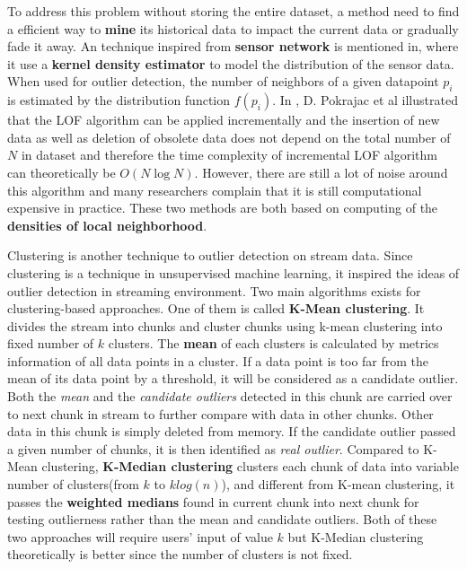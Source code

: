 \documentclass[11pt]{article}       %
\begin{document}
To address this problem without storing the entire dataset, a method need to find a efficient way to \textbf{mine} its historical data to impact the current data or gradually fade it away. An technique inspired from \textbf{sensor network} is mentioned in\cite{ubramaniam:2006:OOD:1182635.1164145}, where it use a \textbf{kernel density estimator} to model the distribution of the sensor data. When used for outlier detection, the number of neighbors of a given datapoint $p_{i}$ is estimated by the distribution function $f(p_{i})$. In \cite{4221341}, D. Pokrajac et al illustrated that the LOF algorithm can be applied incrementally and the insertion of new data as well as deletion of obsolete data does not depend on the total number of $N$ in dataset and therefore the time complexity of incremental LOF algorithm can theoretically be $O(N\log{N})$. However, there are still a lot of noise around this algorithm and many researchers complain that it is still computational expensive in practice. These two methods are both based on computing of the \textbf{densities of local neighborhood}.

Clustering is another technique to outlier detection on stream data. Since clustering is a technique in unsupervised machine learning, it inspired the ideas of outlier detection in streaming environment. Two main algorithms exists for clustering-based approaches. One of them is called \textbf{K-Mean clustering}\cite{4666541}. It divides the stream into chunks and cluster chunks using k-mean clustering into fixed number of $k$ clusters. The \textbf{mean} of each clusters is calculated by metrics information of all data points in a cluster. If a data point is too far from the mean of its data point by a threshold, it will be considered as a candidate outlier. Both the \textit{mean} and the \textit{candidate outliers} detected in this chunk are carried over to next chunk in stream to further compare with data in other chunks. Other data in this chunk is simply deleted from memory. If the candidate outlier passed a given number of chunks, it is then identified as \textit{real outlier}. Compared to K-Mean clustering, \textbf{K-Median clustering}\cite{DBLP:journals/corr/abs-1002-4003} clusters each chunk of data into variable number of clusters(from $k$ to $k log(n)$), and different from K-mean clustering, it passes the \textbf{weighted medians} found in current chunk into next chunk for testing outlierness rather than the mean and candidate outliers. Both of these two approaches will require users' input of value $k$ but K-Median clustering theoretically is better since the number of clusters is not fixed. 




\end{document}
